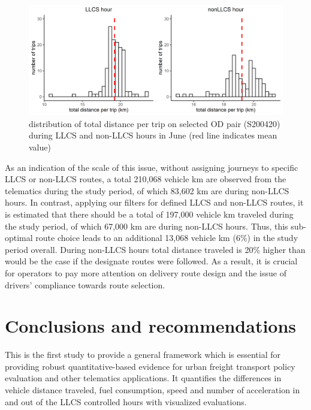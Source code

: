 \documentclass[preprint,12pt,3p]{elsarticle}
\begin{document}
\begin{figure}[H] %
\centering %
\includegraphics[scale=0.8]{S200420dist.png} %
\caption{distribution of total distance per trip on selected OD pair (S200420) during LLCS and non-LLCS hours in June (red line indicates mean value)} %
\label{fig11}
\end{figure}

As an indication of the scale of this issue, without assigning journeys to specific LLCS or non-LLCS routes, a total 210,068 vehicle km are observed from the telematics during the study period, of which 83,602 km are during non-LLCS hours. In contrast, applying our filters for defined LLCS and non-LLCS routes, it is estimated that there should be a total of 197,000 vehicle km traveled during the study period, of which 67,000 km are during non-LLCS hours. Thus, this sub-optimal route choice leads to an additional 13,068 vehicle km (6$\%$) in the study period overall. During non-LLCS hours total distance traveled is 20$\%$ higher than would be the case if the designate routes were followed. As a result, it is crucial for operators to pay more attention on delivery route design and the issue of drivers' compliance towards route selection.



\section{Conclusions and recommendations}

This is the first study to provide a general framework which is essential for providing robust quantitative-based evidence for urban freight transport policy evaluation and other telematics applications. It quantifies the differences in vehicle distance traveled, fuel consumption, speed and number of acceleration in and out of the LLCS controlled hours with visualized evaluations. 
\end{document}
